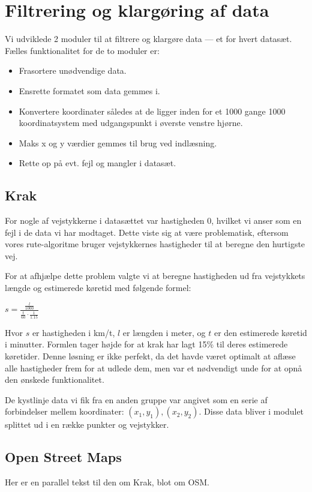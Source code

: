 \section{Filtrering og klargøring af data}
\label{sec:filtreringOgKlargoeringAfData}

Vi udviklede 2 moduler til at filtrere og klargøre data --- et for hvert datasæt. Fælles funktionalitet for de to moduler er:

\begin{itemize}
	\item Frasortere unødvendige data.
	\item Ensrette formatet som data gemmes i.
	\item Konvertere koordinater således at de ligger inden for et 1000 gange 1000 koordinatsystem med udgangspunkt i øverste venstre hjørne.
	\item Maks x og y værdier gemmes til brug ved indlæsning.
	\item Rette op på evt. fejl og mangler i datasæt.
\end{itemize}

\subsection{Krak}
\label{sec:krak}

For nogle af vejstykkerne i datasættet var hastigheden 0, hvilket vi anser som en fejl i de data vi har modtaget. Dette viste sig at være problematisk, eftersom vores rute-algoritme bruger vejstykkernes hastigheder til at beregne den hurtigste vej.

For at afhjælpe dette problem valgte vi at beregne hastigheden ud fra vejstykkets længde og estimerede køretid med følgende formel:

\vspace{1ex}
$s = \frac{\frac{l}{1000}}{\frac{t}{60} \cdot \frac{1}{1.15}}$
\vspace{1ex}

Hvor $s$ er hastigheden i km/t, $l$ er længden i meter, og $t$ er den estimerede køretid i minutter. Formlen tager højde for at krak har lagt 15\% til deres estimerede køretider. Denne løsning er ikke perfekt, da det havde været optimalt at aflæse alle hastigheder frem for at udlede dem, men var et nødvendigt unde for at opnå den ønskede funktionalitet.

De kystlinje data vi fik fra en anden gruppe var angivet som en serie af forbindelser mellem koordinater: $(x_1, y_1), (x_2, y_2)$. Disse data bliver i modulet splittet ud i en række punkter og vejstykker.

\subsection{Open Street Maps}
\label{sec:openStreetMaps}

Her er en parallel tekst til den om Krak, blot om OSM.